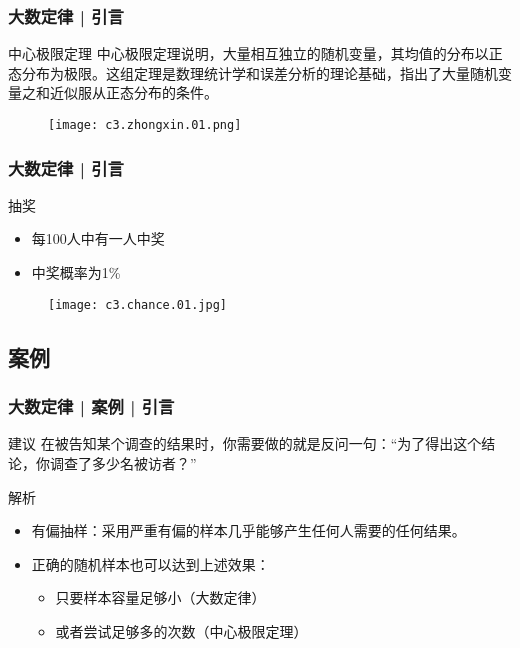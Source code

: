 \begin{frame}
  \frametitle{大数定律 | 引言}
  \begin{block}{中心极限定理}
中心极限定理说明，大量相互独立的随机变量，其均值的分布以正态分布为极限。这组定理是数理统计学和误差分析的理论基础，指出了大量随机变量之和近似服从正态分布的条件。
  \vspace{-1em}
  \begin{figure}
    \centering
    \texttt{[image: c3.zhongxin.01.png]}
  \end{figure}
  \end{block}
\end{frame}

\begin{frame}
  \frametitle{大数定律 | 引言}
  \begin{block}{抽奖}
    \begin{itemize}
      \item 每100人中有一人中奖
      \item 中奖概率为1\%
    \end{itemize}
    \vspace{-1em}
    \begin{figure}
      \centering
      \texttt{[image: c3.chance.01.jpg]}
    \end{figure}
  \end{block}
\end{frame}

\subsection{案例}
\begin{frame}
  \frametitle{大数定律 | 案例 | 引言}
  \begin{block}{建议}
    在被告知某个调查的结果时，你需要做的就是反问一句：“为了得出这个结论，你调查了多少名被访者？”
  \end{block}
  \pause \pause \pause \pause
  \begin{block}{解析}
    \begin{itemize}
      \item 有偏抽样：采用严重有偏的样本几乎能够产生任何人需要的任何结果。
      \item 正确的随机样本也可以达到上述效果：
        \begin{itemize}
          \item 只要样本容量足够小（大数定律）
          \item 或者尝试足够多的次数（中心极限定理）
        \end{itemize}
    \end{itemize}
  \end{block}
\end{frame}


